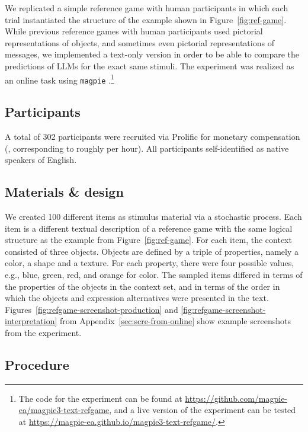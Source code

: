 \documentclass{article}
\begin{document}
We replicated a simple reference game with human participants in which each trial instantiated the structure of the example shown in Figure~\ref{fig:ref-game}.
While previous reference games with human participants used pictorial representations of objects, and sometimes even pictorial representations of messages, we implemented a text-only version in order to be able to compare the predictions of LLMs for the exact same stimuli.
The experiment was realized as an online task using \texttt{magpie} \citep{FrankeJi:magpie:-Minimal}.\footnote{
  The code for the experiment can be found at \href{https://github.com/magpie-ea/magpie3-text-refgame}{https://github.com/magpie-ea/magpie3-text-refgame}, and a live version of the experiment can be tested at \href{https://magpie-ea.github.io/magpie3-text-refgame/}{https://magpie-ea.github.io/magpie3-text-refgame/}.
}


\subsection{Participants}
\label{participants}

A total of 302 participants were recruited via Prolific for monetary
compensation (, corresponding to roughly  per hour).
All participants self-identified as native speakers of English.

\subsection{Materials \& design}
\label{materials-design}

We created 100 different items as stimulus material via a stochastic process.
Each item is a different textual description of a reference game with the same logical structure as the example from Figure~\ref{fig:ref-game}.
For each item, the context consisted of three objects.
Objects are defined by a triple of properties, namely a color, a shape and a texture.
For each property, there were four possible values, e.g., blue, green, red, and orange for color.
The sampled items differed in terms of the properties of the objects in the context set, and in terms of the order in which the objects and expression alternatives were presented in the text.
Figures~\ref{fig:refgame-screenshot-production} and \ref{fig:refgame-screenshot-interpretation} from Appendix~\ref{sec:scre-from-online} show example screenshots from the experiment.

\subsection{Procedure}
\label{procedure}
\end{document}
